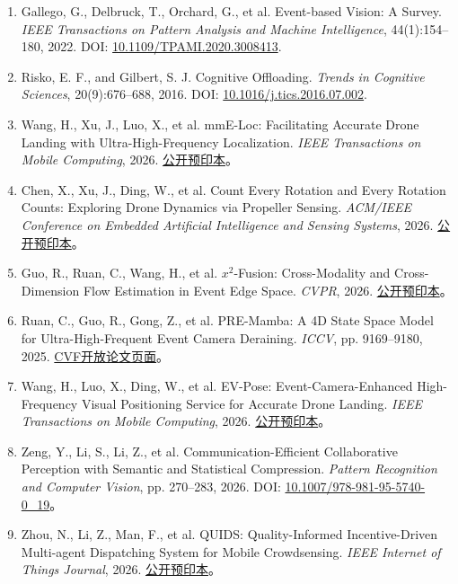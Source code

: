\begin{enumerate}
    \item Gallego, G., Delbruck, T., Orchard, G., et al. Event-based Vision: A Survey. \emph{IEEE Transactions on Pattern Analysis and Machine Intelligence}, 44(1):154--180, 2022. DOI: \href{https://doi.org/10.1109/TPAMI.2020.3008413}{10.1109/TPAMI.2020.3008413}.
    \item Risko, E. F., and Gilbert, S. J. Cognitive Offloading. \emph{Trends in Cognitive Sciences}, 20(9):676--688, 2016. DOI: \href{https://doi.org/10.1016/j.tics.2016.07.002}{10.1016/j.tics.2016.07.002}.
    \item Wang, H., Xu, J., Luo, X., et al. mmE-Loc: Facilitating Accurate Drone Landing with Ultra-High-Frequency Localization. \emph{IEEE Transactions on Mobile Computing}, 2026. \href{https://arxiv.org/abs/2507.09469}{公开预印本}。
    \item Chen, X., Xu, J., Ding, W., et al. Count Every Rotation and Every Rotation Counts: Exploring Drone Dynamics via Propeller Sensing. \emph{ACM/IEEE Conference on Embedded Artificial Intelligence and Sensing Systems}, 2026. \href{https://arxiv.org/abs/2511.13100}{公开预印本}。
    \item Guo, R., Ruan, C., Wang, H., et al. $x^2$-Fusion: Cross-Modality and Cross-Dimension Flow Estimation in Event Edge Space. \emph{CVPR}, 2026. \href{https://arxiv.org/abs/2603.16671}{公开预印本}。
    \item Ruan, C., Guo, R., Gong, Z., et al. PRE-Mamba: A 4D State Space Model for Ultra-High-Frequent Event Camera Deraining. \emph{ICCV}, pp. 9169--9180, 2025. \href{https://openaccess.thecvf.com/content/ICCV2025/html/Ruan_PRE-Mamba_A_4D_State_Space_Model_for_Ultra-High-Frequent_Event_Camera_ICCV_2025_paper.html}{CVF开放论文页面}。
    \item Wang, H., Luo, X., Ding, W., et al. EV-Pose: Event-Camera-Enhanced High-Frequency Visual Positioning Service for Accurate Drone Landing. \emph{IEEE Transactions on Mobile Computing}, 2026. \href{https://arxiv.org/abs/2510.00646}{公开预印本}。
    \item Zeng, Y., Li, S., Li, Z., et al. Communication-Efficient Collaborative Perception with Semantic and Statistical Compression. \emph{Pattern Recognition and Computer Vision}, pp. 270--283, 2026. DOI: \href{https://doi.org/10.1007/978-981-95-5740-0_19}{10.1007/978-981-95-5740-0\_19}。
    \item Zhou, N., Li, Z., Man, F., et al. QUIDS: Quality-Informed Incentive-Driven Multi-agent Dispatching System for Mobile Crowdsensing. \emph{IEEE Internet of Things Journal}, 2026. \href{https://arxiv.org/abs/2512.16325}{公开预印本}。

\end{enumerate}
